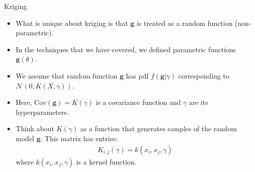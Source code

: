 \documentclass[9pt]{beamer}
\begin{document}

\begin{frame}{Kriging}

\begin{itemize}

\item What is unique about kriging is that $\mathbf{g}$ is treated as a random function (non-parametric). 

\item In the techniques that we have covered, we defined parametric functions $\mathbf{g}(\theta)$.

\item We assume that random function $\mathbf{g}$ has pdf $f(\mathbf{g}|\gamma)$ corresponding to $\mathcal{N}(0,K(X,\gamma))$.  

\item Here, $\textrm{Cov}(\mathbf{g})=K(\gamma)$ is a covariance function and $\gamma$ are its hyperparameters.  

\item Think about $K(\gamma)$ as a function that generates samples of the random model $\mathbf{g}$. This matrix has entries:
\begin{align}
K_{i,j}(\gamma)=k(x_i,x_j,\gamma)
\end{align}
where $k(x_i,x_j,\gamma)$ is a kernel function. 

\end{itemize}


\end{frame}

\end{document}
